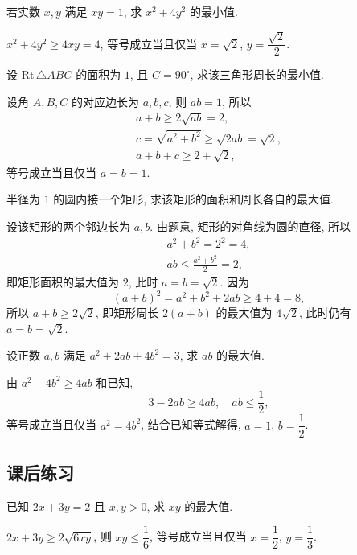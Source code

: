 \begin{exercise}
    若实数 $x,y$ 满足 $xy=1$, 求 $x^2 + 4y^2$ 的最小值.
\end{exercise}
\beginsolution
    $x^2 +4y^2\geqslant 4xy= 4$, 等号成立当且仅当 $x=\sqrt2$, $y=\dfrac{\sqrt2}2$.
\endsolution

\begin{exercise}
    设 $\mathrm{Rt}\,\triangle ABC$ 的面积为 $1$, 且 $C=90^\circ$, 求该三角形周长的最小值.
\end{exercise}
\beginsolution
    设角 $A,B,C$ 的对应边长为 $a,b,c$, 则 $ab=1$, 所以
    \[\begin{gathered}
        a+b\geqslant 2\sqrt{ab}= 2,\\
        c= \sqrt{a^2+b^2}\geqslant \sqrt{2ab}= \sqrt{2},\\
        a+b+c\geqslant 2+\sqrt2,
    \end{gathered}\]
    等号成立当且仅当 $a=b=1$.
\endsolution

\begin{exercise}
    半径为 $1$ 的圆内接一个矩形, 求该矩形的面积和周长各自的最大值.
\end{exercise}
\beginsolution
    设该矩形的两个邻边长为 $a,b$. 由题意, 矩形的对角线为圆的直径, 所以
    \[\begin{gathered}
        a^2+b^2= 2^2= 4,\\
        ab\leqslant \frac{a^2+b^2}{2}= 2,
    \end{gathered}\]
    即矩形面积的最大值为 $2$, 此时 $a=b=\sqrt2$. 因为
    \[(a+b)^2= a^2+b^2+2ab\geqslant 4+4= 8,\]
    所以 $a+b\geqslant 2\sqrt2$, 即矩形周长 $2(a+b)$ 的最大值为 $4\sqrt2$, 此时仍有 $a=b=\sqrt2$.
\endsolution

\begin{exercise}
    设正数 $a,b$ 满足 $a^2+2ab+4b^2= 3$, 求 $ab$ 的最大值.
\end{exercise}
\beginsolution
    由 $a^2+4b^2\geqslant 4ab$ 和已知,
    \[3- 2ab\geqslant 4ab,\quad ab\leqslant \frac12,\]
    等号成立当且仅当 $a^2= 4b^2$, 结合已知等式解得, $a=1$, $b=\dfrac12$.
\endsolution

\subsection{课后练习}
\begin{exercise}
    已知 $2x+3y=2$ 且 $x,y>0$, 求 $xy$ 的最大值.
\end{exercise}
\beginsolution
    $2x+3y\geqslant 2\sqrt{6xy}$, 则 $xy\leqslant \dfrac16$, 等号成立当且仅当 $x=\dfrac12$, $y= \dfrac13$.
\endsolution

